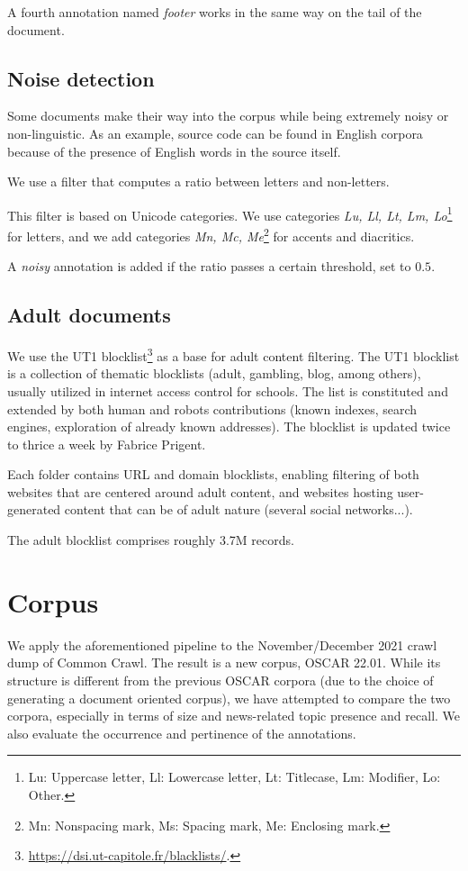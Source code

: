 A fourth annotation named \emph{footer} works in the same way on the tail of the document.

\subsection{Noise detection}

Some documents make their way into the corpus while being extremely noisy or non-linguistic. As an example, source code can be found in English corpora because of the presence of English words in the source itself.

We use a filter that computes a ratio between letters and non-letters.

This filter is based on Unicode categories. We use categories \emph{Lu, Ll, Lt, Lm, Lo}\footnote{Lu: Uppercase letter, Ll: Lowercase letter, Lt: Titlecase, Lm: Modifier, Lo: Other.} for letters, and we add categories \emph{Mn, Mc, Me}\footnote{Mn: Nonspacing mark, Ms: Spacing mark, Me: Enclosing mark.} for accents and diacritics.

A \emph{noisy} annotation is added if the ratio passes a certain threshold, set to $0.5$.


\subsection{Adult documents}

We use the UT1 blocklist\footnote{\url{https://dsi.ut-capitole.fr/blacklists/}.} as a base for adult content filtering. The UT1 blocklist is a collection of thematic blocklists (adult, gambling, blog, among others), usually utilized in internet access control for schools. The list is constituted and extended by both human and robots contributions (known indexes, search engines, exploration of already known addresses). The blocklist is updated twice to thrice a week by Fabrice Prigent.

Each folder contains URL and domain blocklists, enabling filtering of both websites that are centered around adult content, and websites hosting user-generated content that can be of adult nature (several social networks...).

The adult blocklist comprises roughly 3.7M records.


\section{Corpus}

We apply the aforementioned pipeline to the November/December 2021 crawl dump of Common Crawl. The result is a new corpus, OSCAR 22.01. While its structure is different from the previous OSCAR corpora (due to the choice of generating a document oriented corpus), we have attempted to compare the two corpora, especially in terms of size and news-related topic presence and recall. We also evaluate the occurrence and pertinence of the annotations.

